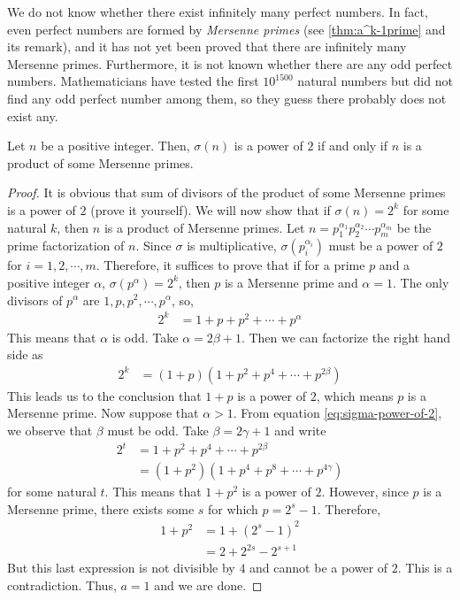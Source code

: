 \begin{remark}
	We do not know whether there exist infinitely many perfect numbers. In fact, even perfect numbers are formed by \textit{Mersenne primes} (see \autoref{thm:a^k-1prime} and its remark), and it has not yet been proved that there are infinitely many Mersenne primes. Furthermore, it is not known whether there are any odd perfect numbers. Mathematicians have tested the first $10^{1500}$ natural numbers but did not find any odd perfect number among them, so they guess there probably does not exist any.
\end{remark}

\begin{theorem}
	Let $n$ be a positive integer. Then, $\sigma(n)$ is a power of $2$ if and only if $n$ is a product of some Mersenne primes.
\end{theorem}

\begin{proof}
	It is obvious that sum of divisors of the product of some Mersenne primes is a power of $2$ (prove it yourself). We will now show that if $\sigma(n)=2^k$ for some natural $k$, then $n$ is a product of Mersenne primes. Let $n = p_1^{\alpha_1}p_2^{\alpha_2} \cdots p_m^{\alpha_m}$ be the prime factorization of $n$. Since $\sigma$ is multiplicative,  $\sigma(p_i^{\alpha_i})$ must be a power of $2$ for $i=1,2,\cdots,m$. Therefore, it suffices to prove that if for a prime $p$ and a positive integer $\alpha$, $\sigma(p^\alpha) = 2^k$, then $p$ is a Mersenne prime and $\alpha = 1$. The only divisors of $p^\alpha$ are $1,p,p^2,\cdots,p^\alpha$, so,
		\begin{align*}
			2^k &= 1 + p + p^2 + \cdots + p^\alpha
		\end{align*}
	This means that $\alpha$ is odd. Take $\alpha= 2\beta+ 1$. Then we can factorize the right hand side as
		\begin{align}
			2^k &= (1+p)\left(1 + p^2 + p^4 + \cdots + p^{2\beta}\right) \label{eq:sigma-power-of-2}
		\end{align}
	This leads us to the conclusion that $1+p$ is a power of $2$, which means $p$ is a Mersenne prime. Now suppose that $\alpha > 1$. From equation \ref{eq:sigma-power-of-2}, we observe that $\beta$ must be odd. Take $\beta = 2 \gamma + 1$ and write
		\begin{align*}
			2^t &= 1 + p^2 + p^4 + \cdots + p^{2\beta}\\
				&= \left(1+p^2\right)\left(1+p^4 + p^8 + \cdots + p^{4 \gamma}\right)
		\end{align*}
	for some natural $t$. This means that $1+p^2$ is a power of $2$. However, since $p$ is a Mersenne prime, there exists some $s$ for which $p=2^s - 1$. Therefore,
		\begin{align*}
			1+p^2 &= 1 + (2^s -1)^2\\
		  &= 2 + 2^{2s} - 2^{s+1}
		\end{align*}
	But this last expression is not divisible by $4$ and cannot be a power of $2$. This is a contradiction. Thus, $a=1$ and we are done.
\end{proof}


